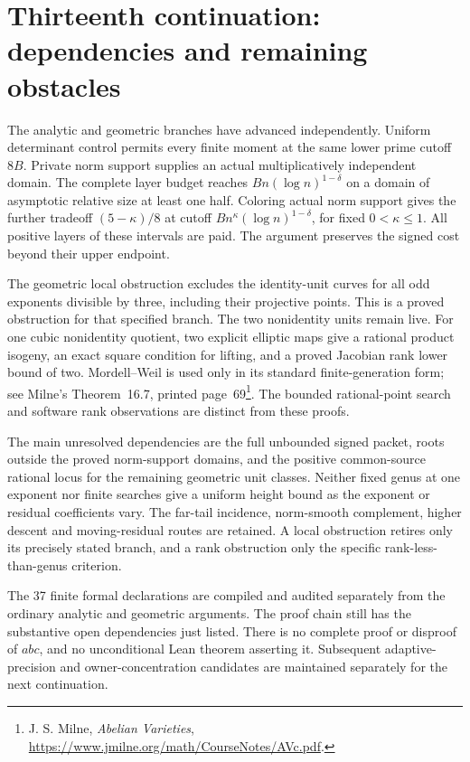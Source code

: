 \section{Thirteenth continuation: dependencies and remaining obstacles}
\label{thirteenth-status}

The analytic and geometric branches have advanced independently.
Uniform determinant control permits every finite moment at the same
lower prime cutoff $8B$. Private norm support supplies an actual
multiplicatively independent domain. The complete layer budget reaches
$Bn(\log n)^{1-\delta}$ on a domain of asymptotic relative size at least
one half. Coloring actual norm support gives the further tradeoff
$(5-\kappa)/8$ at cutoff $Bn^\kappa(\log n)^{1-\delta}$,
for fixed $0<\kappa\le1$. All positive layers of these intervals are paid.
The argument preserves the signed cost beyond their upper endpoint.

The geometric local obstruction excludes the identity-unit curves for
all odd exponents divisible by three, including their projective points.
This is a proved obstruction for that specified branch. The two
nonidentity units remain live. For one cubic nonidentity quotient,
two explicit elliptic maps give a rational product isogeny, an exact
square condition for lifting, and a proved Jacobian rank lower bound of
two. Mordell--Weil is used only in its standard finite-generation form;
see Milne's Theorem~16.7, printed page~69\footnote{J. S. Milne,
\emph{Abelian Varieties},
\url{https://www.jmilne.org/math/CourseNotes/AVc.pdf}.}.
The bounded rational-point search and software rank observations
are distinct from these proofs.

The main unresolved dependencies are the full unbounded signed packet,
roots outside the proved norm-support domains, and the positive
common-source rational locus for the remaining geometric unit classes.
Neither fixed genus at one exponent nor finite searches give a uniform
height bound as the exponent or residual coefficients vary.
The far-tail incidence, norm-smooth complement, higher descent and
moving-residual routes are retained. A local obstruction retires only
its precisely stated branch, and a rank obstruction only the specific
rank-less-than-genus criterion.

The 37 finite formal declarations are compiled and audited separately
from the ordinary analytic and geometric arguments. The proof chain
still has the substantive open dependencies just listed. There is no
complete proof or disproof of $abc$, and no unconditional Lean theorem
asserting it. Subsequent adaptive-precision and owner-concentration
candidates are maintained separately for the next continuation.
